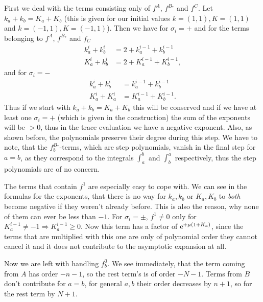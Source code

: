 \begin{MainTheorem}
\begin{Proof}
    First we deal with the terms consisting only of $f^A$, $f^{B_*}$ and $f^C$.
    Let $k_a + k_b = K_a + K_b$ (this is given for our initial values $k =
    (1,1), K = (1,1)$ and $k = (-1,1), K=(-1,1)$). Then we have for $\sigma_i =
    +$ and for the terms belonging to $f^A$, $f^{B_*}$ and $f_C$
    \begin{align*}
      k^i_a + k^i_b &= 2 + k^{i-1}_a + k^{i-1}_b \\
      K^i_a + k^i_b &= 2 + K^{i-1}_a + K^{i-1}_b,
    \end{align*}
    and for $\sigma_i = -$
    \begin{align*}
      k^i_a + k^i_b &= k^{i-1}_a + k^{i-1}_b \\
      K^i_a + K^i_a &= K^{i-1}_a + K^{i-1}_b.
    \end{align*}
    Thus if we start with $k_a + k_b = K_a + K_b$ this will be conserved and if
    we have at least one $\sigma_i = +$ (which is given in the construction) the
    sum of the exponents will be $> 0$, thus in the trace evaluation we have a
    negative exponent. Also, as shown before, the polynomials preserve their
    degree during this step. We have to note, that the $f^{B_*}_b$-terms,
    which are step polynomials, vanish in the final step for $a = b$, as they
    correspond to the integrals $\int_a^b$ and $\int_b^a$ respectively, thus
    the step polynomials are of no concern.

    The terms that contain $f^1$ are especially easy to cope with. We can see in
    the formulas for the exponents, that there is no way for $k_a, k_b$ or $K_a,
    K_b$ to \emph{both} become negative if they weren't already before. This is
    also the reason, why none of them can ever be less than $-1$.
    For $\sigma_i = \pm$, $f^1 \neq 0$ only for $K^{i-1}_a \neq -1 \Rightarrow
    K^{i-1}_a \geq 0$. Now this term has a factor of $\mathrm e^{+\mu (1+K_a)}$, since
    the terms that are multiplied with this one are only of polynomial order
    they cannot cancel it and it does not contribute to the asymptotic expansion
    at all.

    Now we are left with handling $f^0_b$. We see immediately, that the term
    coming from $A$ has order $-n-1$, so the rest term's is of order $-N-1$.
    Terms from $B$ don't contribute for $a=b$, for general $a,b$ their order
    decreases by $n+1$, so for the rest term by $N+1$.


\end{Proof}
\end{MainTheorem}
